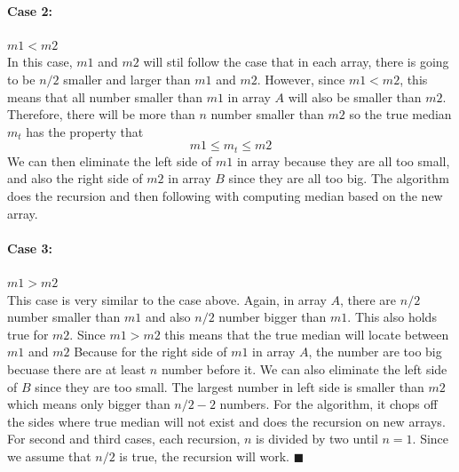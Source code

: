 \documentclass{article}
\begin{document}
    \paragraph*{Case 2:} $m1 < m2$ \\
    In this case, $m1$ and $m2$ will stil follow the case that in each array, there is going to be $n/2$ smaller and larger than $m1$ and $m2$. However, since $m1 < m2$,
    this means that all number smaller than $m1$ in array $A$ will also be smaller than $m2$. Therefore, there will be more than $n$ number smaller than $m2$ so the true 
    median $m_t$ has the property that
    $$m1 \leq m_t \leq m2$$
    We can then eliminate the left side of $m1$ in array because they are all too small, and also the right side of $m2$ in array $B$ since they are all too big.
    The algorithm does the recursion and then following with computing median based on the new array.
    \paragraph*{Case 3:} $m1 > m2$ \\
    This case is very similar to the case above. Again, in array $A$, there are $n/2$ number smaller than $m1$ and also $n/2$ number bigger than $m1$. This also holds true
    for $m2$. Since $m1 > m2$ this means that the true median will locate between $m1$ and $m2$ Because for the right side of $m1$ in array $A$, the number are too big becuase
    there are at least $n$ number before it. We can also eliminate the left side of $B$ since they are too small. The largest number in left side is smaller than $m2$
    which means only bigger than $n/2 - 2$ numbers. For the algorithm, it chops off the sides where true median will not exist and does the recursion on new arrays.\\
    For second and third cases, each recursion, $n$ is divided by two until $n=1$. Since we assume that $n/2$ is true, the recursion will work. $\blacksquare$
\end{document}
